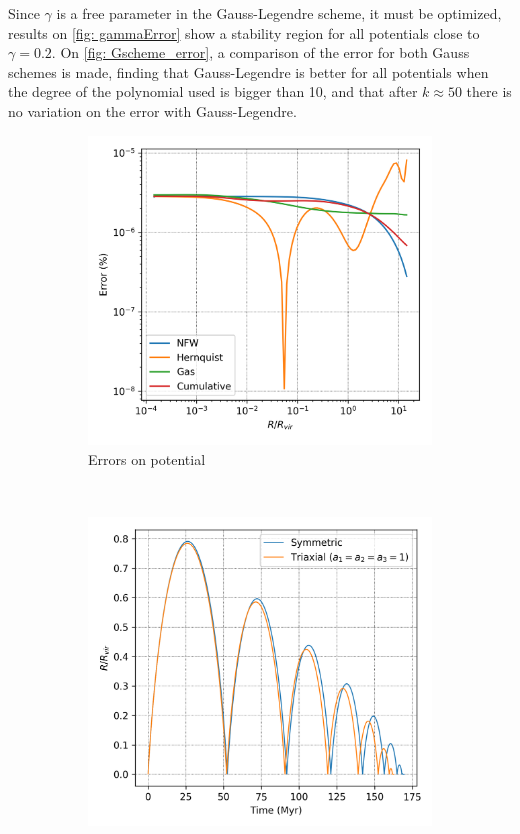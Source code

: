 		Since $\gamma$ is a free parameter in the Gauss-Legendre scheme, it must be optimized, results on \autoref{fig: gammaError} show a stability region for all potentials close to $\gamma = 0.2$. On \autoref{fig: Gscheme_error}, a comparison of the error for both Gauss schemes is made, finding that Gauss-Legendre is better for all potentials when the degree of the polynomial used is bigger than 10, and that after $k \approx 50$ there is no variation on the error with Gauss-Legendre.
		\begin{figure}[h]
			\centering
			\begin{subfigure}[t]{0.49\textwidth}
				\includegraphics[width = \textwidth]{"../Files/Week 8/error"}
				\caption{Errors on potential}
				\label{fig: potentialErrors}
			\end{subfigure}
			~ 
			\begin{subfigure}[t]{0.49\textwidth}
				\includegraphics[width = \textwidth]{"../Files/Week 7/symmetric_triaxial"}

\end{subfigure}
\end{figure}
